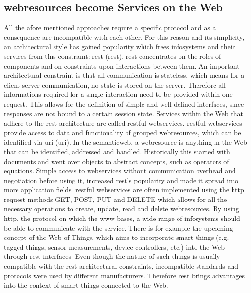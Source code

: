 \subsection{\glspl{webresource} become Services on the Web}
All the afore mentioned approaches require a specific protocol and as a consequence are incompatible with each other.
For this reason and its simplicity, an architectural style has gained popularity which frees \textrm{\glspl{infosystem}} and their services from this constraint: \textrm{\acrlong{rest} (\acrshort{rest})}\cite{fielding2000architectural}.
\textrm{\acrshort{rest}} concentrates on the roles of components and on constraints upon interactions between them.
An important architectural constraint is that all communication is stateless, which means for a client-server communication, no state is stored on the server.
Therefore all informations required for a single interaction need to be provided within one request.
This allows for the definition of simple and well-defined interfaces, since responses are not bound to a certain session state. 
Services within the Web that adhere to the \textrm{\acrshort{rest}} architecture are called \textrm{\acrshort{rest}ful \glspl{webservice}}.
\textrm{\acrshort{rest}ful \glspl{webservice}} provide access to data and functionality of grouped \textrm{\glspl{webresource}}, which can be identified via \textrm{\acrlong{uri} (\acrshort{uri})}\cite{masinter2005uniform}.
In the \textrm{\gls{semanticweb}}\cite{berners2001semantic}, a \textrm{\gls{webresource}} is anything in the Web that can be identified, addressed and handled.
Historically this started with documents and went over objects to abstract concepts, such as operators of equations. %
Simple access to \textrm{\glspl{webservice}} without communication overhead and negotiation before using it, increased \textrm{\acrshort{rest}}'s popularity and made it spread into more application fields.
\textrm{\acrshort{rest}ful \glspl{webservice}} are often implemented using the \textrm{\acrshort{http}} request methods \textrm{GET}, \textrm{POST}, \textrm{PUT} and \textrm{DELETE} which allows for all the necessary operations to create, update, read and delete \textrm{\glspl{webresource}}.
By using \textrm{\acrshort{http}}, the protocol on which the \textrm{\gls{www}} bases, a wide range of \textrm{\glspl{infosystem}} should be able to communicate with the service.
There is for example the upcoming concept of the \textrm{Web of Things}\cite{5678452}, which aims to incorporate smart things (e.g. tagged things, sensor measurements, device controllers, etc.) into the Web through \textrm{\acrshort{rest}} interfaces.
Even though the nature of such things is usually compatible with the \textrm{\acrshort{rest}} architectural constraints, incompatible standards and protocols were used by different manufacturers.
Therefore \textrm{\acrshort{rest}} brings advantages into the context of smart things connected to the Web.

